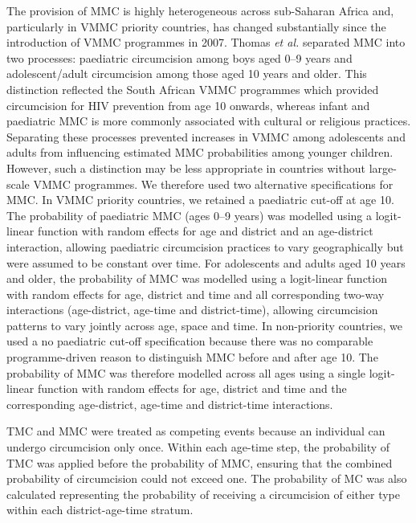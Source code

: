 \documentclass{article}
\begin{document}
The provision of MMC is highly heterogeneous across sub-Saharan Africa and, particularly in VMMC priority countries, has changed substantially since the introduction of VMMC programmes in 2007. Thomas {\it et al.} \cite{thomas2024substantial} separated MMC into two processes: paediatric circumcision among boys aged 0--9 years and adolescent/adult circumcision among those aged 10 years and older. This distinction reflected the South African VMMC programmes which provided circumcision for HIV prevention from age 10 onwards, whereas infant and paediatric MMC is more commonly associated with cultural or religious practices. Separating these processes prevented increases in VMMC among adolescents and adults from influencing estimated MMC probabilities among younger children. However, such a distinction may be less appropriate in countries without large-scale VMMC programmes. We therefore used two alternative specifications for MMC. In VMMC priority countries, we retained a paediatric cut-off at age 10. The probability of paediatric MMC (ages 0--9 years) was modelled using a logit-linear function with random effects for age and district and an age-district interaction, allowing paediatric circumcision practices to vary geographically but were assumed to be constant over time. For adolescents and adults aged 10 years and older, the probability of MMC was modelled using a logit-linear function with random effects for age, district and time and all corresponding two-way interactions (age-district, age-time and district-time), allowing circumcision patterns to vary jointly across age, space and time. In non-priority countries, we used a no paediatric cut-off specification because there was no comparable programme-driven reason to distinguish MMC before and after age 10. The probability of MMC was therefore modelled across all ages using a single logit-linear function with random effects for age, district and time and the corresponding age-district, age-time and district-time interactions.

TMC and MMC were treated as competing events because an individual can undergo circumcision only once. Within each age-time step, the probability of TMC was applied before the probability of MMC, ensuring that the combined probability of circumcision could not exceed one. The probability of MC was also calculated representing the probability of receiving a circumcision of either type within each district-age-time stratum.

\end{document}
